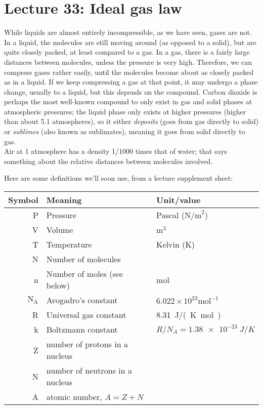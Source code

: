 
\section{Lecture 33: Ideal gas law}

While liquids are almost entirely incompressible, as we have seen, gases are not. In a liquid, the molecules are still moving around (as opposed to a solid), but are quite closely packed, at least compared to a gas. In a gas, there is a fairly large distances between molecules, unless the pressure is very high. Therefore, we can compress gases rather easily, until the molecules become about as closely packed as in a liquid. If we keep compressing a gas at that point, it may undergo a phase change, usually to a liquid, but this depends on the compound. Carbon dioxide is perhaps the most well-known compound to only exist in gas and solid phases at atmospheric pressures; the liquid phase only exists at higher pressures (higher than about 5.1 atmospheres), so it either \emph{deposits} (goes from gas directly to solid) or \emph{sublimes} (also known as sublimates), meaning it goes from solid directly to gas.\\
Air at 1 atmosphere has a density 1/1000 times that of water; that says something about the relative distances between molecules involved.

Here are some definitions we'll soon use, from a lecture supplement sheet:

\begin{center}
\begin{tabular}{|r|l|l|}
\hline
Symbol & Meaning & Unit/value\\ \hline
P & Pressure & Pascal ($\text{N/m}^2$)\\
V & Volume & $\text{m}^3$\\
T & Temperature & Kelvin (K)\\
N & Number of molecules & \\
n & Number of moles (see below) & mol\\
$\text{N}_\text{A}$ & Avogadro's constant & $6.022 \times 10^{23} \text{mol}^{-1}$ \\
R & Universal gas constant & \SI{8.31}{J/(K mol)}\\
k & Boltzmann constant & $R/N_A = \SI{1.38e-23}{J/K}$\\
Z & number of protons in a nucleus & \\
N &  number of neutrons in a nucleus & \\
A & atomic number, $A = Z + N$ & \\ \hline
\end{tabular}
\end{center}

